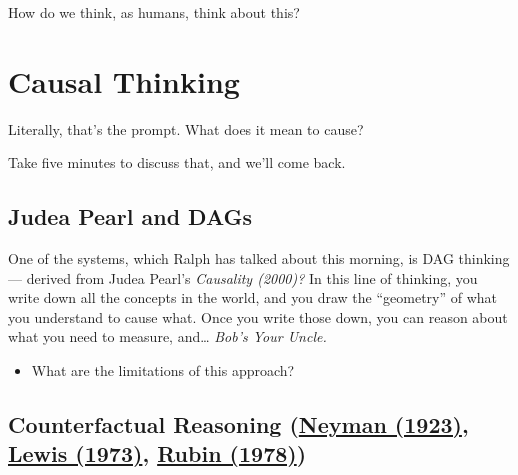 \documentclass[
  letterpaper,
  DIV=11,
  numbers=noendperiod]{scrreprt}
\providecommand{\tightlist}{%
  \setlength{\itemsep}{0pt}\setlength{\parskip}{0pt}}\usepackage{longtable,booktabs,array}
\begin{document}
How do we think, as humans, think about this?

\section{Causal Thinking}\label{causal-thinking}

\begin{tcolorbox}[enhanced jigsaw, bottomtitle=1mm, coltitle=black, colback=white, colframe=quarto-callout-note-color-frame, title=\textcolor{quarto-callout-note-color}{\faInfo}\hspace{0.5em}{What does it mean for an action to \emph{cause} an outcome?}, opacityback=0, arc=.35mm, titlerule=0mm, leftrule=.75mm, toptitle=1mm, rightrule=.15mm, opacitybacktitle=0.6, colbacktitle=quarto-callout-note-color!10!white, toprule=.15mm, left=2mm, bottomrule=.15mm, breakable]

Literally, that's the prompt. What does it mean to cause?

Take five minutes to discuss that, and we'll come back.

\end{tcolorbox}

\subsection{Judea Pearl and DAGs}\label{judea-pearl-and-dags}

One of the systems, which Ralph has talked about this morning, is DAG
thinking --- derived from Judea Pearl's \emph{Causality (2000)?} In this
line of thinking, you write down all the concepts in the world, and you
draw the ``geometry'' of what you understand to cause what. Once you
write those down, you can reason about what you need to measure,
and\ldots{} \emph{Bob's Your Uncle.}

\begin{itemize}
\tightlist
\item
  What are the limitations of this approach?
\end{itemize}

\subsection{\texorpdfstring{Counterfactual Reasoning
(\href{https://www.jstor.org/stable/2245382?seq=1}{Neyman (1923)},
\href{https://web.archive.org/web/20170809031235id_/http://andrewmbailey.com/dkl/Counterfactuals_Comparative.pdf}{Lewis
(1973)}, \href{https://www.jstor.org/stable/pdf/2958688}{Rubin
(1978)})}{Counterfactual Reasoning (Neyman (1923), Lewis (1973), Rubin (1978))}}\label{counterfactual-reasoning-neyman-1923-lewis-1973-rubin-1978}
\end{document}
